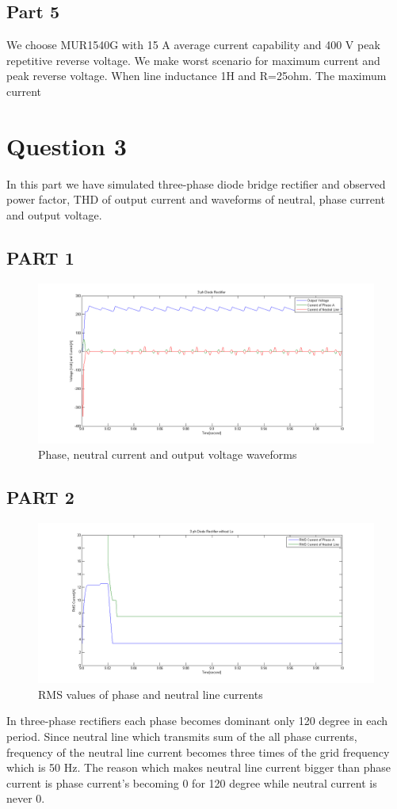 \documentclass[fleqn, a4paper]{article}
\begin{document}
\subsection*{Part 5}
We choose MUR1540G with 15 A average current capability and 400 V peak repetitive reverse voltage. We make worst scenario for maximum current and peak reverse voltage. 
When line inductance 1H and R=25ohm. The maximum current 

\section*{Question 3}
In this part we have simulated three-phase diode bridge rectifier and observed power factor, THD of output current and waveforms of neutral, phase current and output voltage.
\subsection{PART 1}
\begin{figure}[H]
  \includegraphics[width=\linewidth]{A3_1.png}
  \caption{Phase, neutral current and output voltage waveforms}
  \label{fig:simulink3}
\end{figure}

\subsection{PART 2}
\begin{figure}[H]
  \includegraphics[width=\linewidth]{A3_3.png}
  \caption{RMS values of phase and neutral line currents}
  \label{fig:simulink3}
\end{figure}
In three-phase rectifiers each phase becomes dominant only 120 degree in each period. Since neutral line which transmits sum of the all phase currents, frequency of the neutral line current becomes three times of the grid frequency which is 50 Hz. The reason which makes neutral line current bigger than phase current is phase current's becoming 0 for 120 degree while neutral current is never 0.
\end{document}
